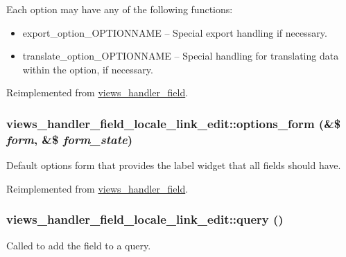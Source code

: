  Each option may have any of the following functions:\begin{itemize}
\item export\_\-option\_\-OPTIONNAME -- Special export handling if necessary.\item translate\_\-option\_\-OPTIONNAME -- Special handling for translating data within the option, if necessary. \end{itemize}


Reimplemented from \hyperlink{classviews__handler__field_64c69a8a3697603f8283405071c25b76}{views\_\-handler\_\-field}.\hypertarget{classviews__handler__field__locale__link__edit_dcbd4b327f8cbcd2d75e0c145b00e42d}{
\subsubsection[{options\_\-form}]{\setlength{\rightskip}{0pt plus 5cm}views\_\-handler\_\-field\_\-locale\_\-link\_\-edit::options\_\-form (\&\$ {\em form}, \/  \&\$ {\em form\_\-state})}}
\label{classviews__handler__field__locale__link__edit_dcbd4b327f8cbcd2d75e0c145b00e42d}


Default options form that provides the label widget that all fields should have. 

Reimplemented from \hyperlink{classviews__handler__field_0435d161922b7b4b84f02a2e79bb947a}{views\_\-handler\_\-field}.\hypertarget{classviews__handler__field__locale__link__edit_da85b88e681ca38a7c7d66deb133ae65}{
\subsubsection[{query}]{\setlength{\rightskip}{0pt plus 5cm}views\_\-handler\_\-field\_\-locale\_\-link\_\-edit::query ()}}
\label{classviews__handler__field__locale__link__edit_da85b88e681ca38a7c7d66deb133ae65}


Called to add the field to a query. 


